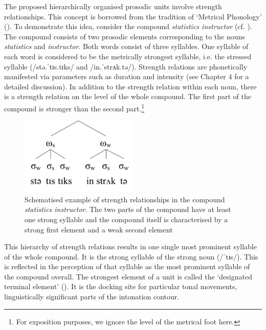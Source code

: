 The proposed hierarchically organised prosodic units involve strength relationships. This concept is borrowed from the tradition of ‘Metrical Phonology’ (\citealt{Leben1976,LibermanPrince1977}). To demonstrate this idea, consider the compound \textit{statistics instructor} (cf. ). The compound consists of two prosodic elements corresponding to the nouns \textit{statistics} and \textit{instructor}. Both words consist of three syllables. One syllable of each word is considered to be the metrically strongest syllable, i.e. the stressed syllable (/stə.ˈtɪs.tɪks/ and /in.ˈstrʌk.tə/). Strength relations are phonetically manifested via parameters such as duration and intensity (see Chapter 4 for a detailed discussion). In addition to the strength relation within each noun, there is a strength relation on the level of the whole compound. The first part of the compound is stronger than the second part.\footnote{For exposition purposes, we ignore the level of the metrical foot here.}

\begin{figure}
  \centering 
   \includegraphics[width=0.5\textwidth]{figures/Figure_2_2.png}
  \caption{Schematised example of strength relationships in the compound \textit{statistics instructor}. The two parts of the compound have at least one strong syllable and the compound itself is characterised by a strong first element and a weak second element}
   \label{fig:2.2}
   \end{figure}


This hierarchy of strength relations results in one single most prominent syllable of the whole compound. It is the strong syllable of the strong noun (/ˈtɪs/). This is reflected in the perception of that syllable as the most prominent syllable of the compound overall. The strongest element of a unit is called the ‘designated terminal element’ (\citealt{LibermanPrince1977,Ladd2008}). It is the docking site for particular tonal movements, linguistically significant parts of the intonation contour. 

